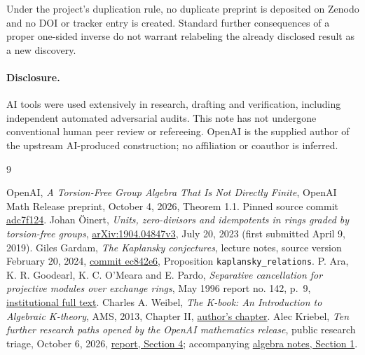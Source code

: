 \documentclass[11pt]{article}
\begin{document}
Under the project's duplication rule, no duplicate preprint is deposited
on Zenodo and no DOI or tracker entry is created. Standard further
consequences of a proper one-sided inverse do not warrant relabeling
the already disclosed result as a new discovery.

\paragraph{Disclosure.}
AI tools were used extensively in research, drafting and verification,
including independent automated adversarial audits. This note has not
undergone conventional human peer review or refereeing. OpenAI is the
supplied author of the upstream AI-produced construction; no affiliation
or coauthor is inferred.

\begin{thebibliography}{9}
\raggedright
{} OpenAI, \emph{A Torsion-Free Group Algebra That Is Not
Directly Finite}, OpenAI Math Release preprint, October 4, 2026,
Theorem 1.1. Pinned source commit
\href{https://github.com/openai/math/tree/adc7f1241b42e322a6451854ab7e4b4c146bf78a/preprints/A-Torsion-Free-Group-Algebra-That-Is-Not-Directly-Finite-October-4-2026}{adc7f124}.
 Johan {\"O}inert, \emph{Units, zero-divisors and idempotents
in rings graded by torsion-free groups},
\href{https://arxiv.org/abs/1904.04847v3}{arXiv:1904.04847v3}, July 20, 2023
(first submitted April 9, 2019).
 Giles Gardam, \emph{The Kaplansky conjectures}, lecture
notes, source version February 20, 2024,
\href{https://github.com/gilesgardam/lectures/blob/ec842e6a09851e98a38e2a4bea3b273b4a9debb9/kaplansky.tex}{commit ec842e6}, Proposition
\texttt{kaplansky\_relations}.
 P. Ara, K. R. Goodearl, K. C. O'Meara and E. Pardo,
\emph{Separative cancellation for projective modules over exchange rings},
May 1996 report no. 142, p.~9,
\href{https://ir.canterbury.ac.nz/bitstreams/9810640d-0c02-42b1-a9ac-49f0f8bd703b/download}{institutional full text}.
 Charles A. Weibel, \emph{The K-book: An Introduction to
Algebraic K-theory}, AMS, 2013, Chapter II,
\href{https://sites.math.rutgers.edu/~weibel/Kbook/Kbook.ii.pdf}{author's chapter}.
 Alec Kriebel, \emph{Ten further research paths opened by
the OpenAI mathematics release}, public research triage, October 6, 2026,
\href{https://github.com/AlecKriebel/Math/blob/f27318d83bd7000ef817957a9a4b3087de28d198/openai_followon_batch2_20261006/REPORT.md}{report, Section 4}; accompanying
\href{https://github.com/AlecKriebel/Math/blob/f27318d83bd7000ef817957a9a4b3087de28d198/openai_followon_batch2_20261006/agent_notes/algebra_groups.md}{algebra notes, Section 1}.
\end{thebibliography}
\end{document}
